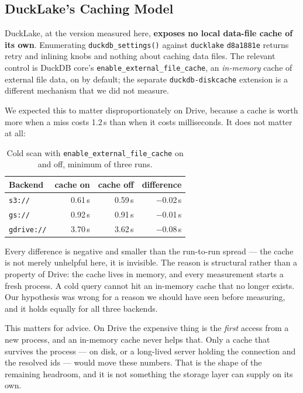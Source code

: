 \documentclass[sigconf, nonacm]{acmart}
\begin{document}
\subsection{DuckLake's Caching Model}

DuckLake, at the version measured here, \textbf{exposes no local data-file
cache of its own}. Enumerating \texttt{duckdb\_settings()} against
\texttt{ducklake} \texttt{d8a1881e} returns retry and inlining knobs and
nothing about caching data files. The relevant control is DuckDB core's
\texttt{enable\_external\_file\_cache}, an \emph{in-memory} cache of external
file data, on by default; the separate \texttt{duckdb-diskcache} extension is
a different mechanism that we did not measure.

We expected this to matter disproportionately on Drive, because a cache is
worth more when a miss costs 1.2\,s than when it costs milliseconds. It does
not matter at all:

\begin{table}[t]
\caption{Cold scan with \texttt{enable\_external\_file\_cache} on and off,
minimum of three runs.}
\label{tab:dlcache}
\small
\begin{tabular}{lrrr}
\toprule
Backend & cache on & cache off & difference \\
\midrule
\texttt{s3://}     & 0.61\,s & 0.59\,s & $-$0.02\,s \\
\texttt{gs://}     & 0.92\,s & 0.91\,s & $-$0.01\,s \\
\texttt{gdrive://} & 3.70\,s & 3.62\,s & $-$0.08\,s \\
\bottomrule
\end{tabular}
\end{table}

Every difference is negative and smaller than the run-to-run spread --- the
cache is not merely unhelpful here, it is invisible. The reason is structural
rather than a property of Drive: the cache lives in memory, and every
measurement starts a fresh process. A cold query cannot hit an in-memory cache
that no longer exists. Our hypothesis was wrong for a reason we should have
seen before measuring, and it holds equally for all three backends.

This matters for advice. On Drive the expensive thing is the \emph{first}
access from a new process, and an in-memory cache never helps that. Only a
cache that survives the process --- on disk, or a long-lived server holding the
connection and the resolved ids --- would move these numbers. That is the shape
of the remaining headroom, and it is not something the storage layer can supply
on its own.
\end{document}

